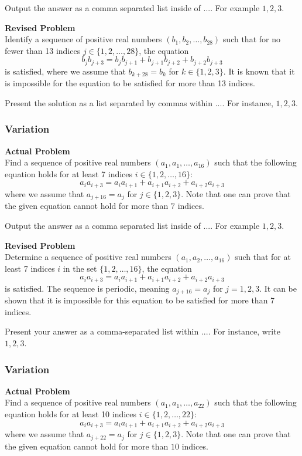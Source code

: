 Output the answer as a comma separated list inside of $\boxed{...}$. For example $\boxed{1, 2, 3}$.

\textbf{Revised Problem}\\
Identify a sequence of positive real numbers $(b_1, b_2, \ldots, b_{28})$ such that for no fewer than 13 indices $j \in \{1, 2, \ldots, 28\}$, the equation $$ b_j b_{j+3} = b_j b_{j+1} + b_{j+1} b_{j+2} + b_{j+2} b_{j+3} $$ is satisfied, where we assume that $b_{k+28} = b_k$ for $k \in \{1, 2, 3\}$. It is known that it is impossible for the equation to be satisfied for more than 13 indices.

Present the solution as a list separated by commas within $\boxed{...}$. For instance, $\boxed{1, 2, 3}$.

\subsubsection{Variation}
\textbf{Actual Problem}\\
Find a sequence of positive real numbers $(a_1, a_1, \ldots, a_{16})$ such that the following equation holds for at least
7 indices $i \in \{ 1,2,\ldots,16 \}$: $$ a_i a_{i+3} = a_{i}a_{i+1} + a_{i+1}a_{i+2} + a_{i+2}a_{i+3}$$ where we assume that
$a_{j+16} = a_j$ for $j \in \{1,2,3\}$.
Note that one can prove that the given equation cannot hold for more than $7$ indices.


Output the answer as a comma separated list inside of $\boxed{...}$. For example $\boxed{1, 2, 3}$.

\textbf{Revised Problem}\\
Determine a sequence of positive real numbers $(a_1, a_2, \ldots, a_{16})$ such that for at least 7 indices $i$ in the set $\{1, 2, \ldots, 16\}$, the equation $$ a_i a_{i+3} = a_{i}a_{i+1} + a_{i+1}a_{i+2} + a_{i+2}a_{i+3} $$ is satisfied. The sequence is periodic, meaning $a_{j+16} = a_j$ for $j = 1, 2, 3$. It can be shown that it is impossible for this equation to be satisfied for more than 7 indices.

Present your answer as a comma-separated list within $\boxed{...}$. For instance, write $\boxed{1, 2, 3}$.

\subsubsection{Variation}
\textbf{Actual Problem}\\
Find a sequence of positive real numbers $(a_1, a_1, \ldots, a_{22})$ such that the following equation holds for at least
10 indices $i \in \{ 1,2,\ldots,22 \}$: $$ a_i a_{i+3} = a_{i}a_{i+1} + a_{i+1}a_{i+2} + a_{i+2}a_{i+3}$$ where we assume that
$a_{j+22} = a_j$ for $j \in \{1,2,3\}$.
Note that one can prove that the given equation cannot hold for more than $10$ indices.


